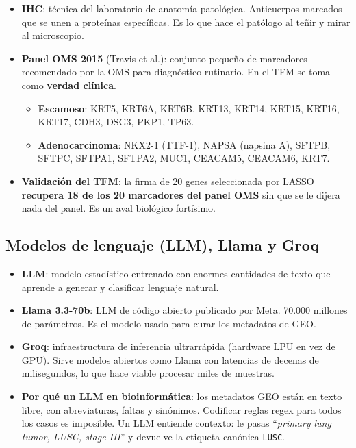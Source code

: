 \documentclass[11pt, a4paper]{article}
\begin{document}
\begin{itemize}[leftmargin=1.2em, itemsep=2pt]
  \item \textbf{IHC}: t\'ecnica del laboratorio de anatom\'ia patol\'ogica. Anticuerpos marcados que se unen a prote\'inas espec\'ificas. Es lo que hace el pat\'ologo al te\~nir y mirar al microscopio.
  \item \textbf{Panel OMS 2015} (Travis et al.): conjunto peque\~no de marcadores recomendado por la OMS para diagn\'ostico rutinario. En el TFM se toma como \textbf{verdad cl\'inica}.
  \begin{itemize}
    \item \textbf{Escamoso}: KRT5, KRT6A, KRT6B, KRT13, KRT14, KRT15, KRT16, KRT17, CDH3, DSG3, PKP1, TP63.
    \item \textbf{Adenocarcinoma}: NKX2-1 (TTF-1), NAPSA (napsina A), SFTPB, SFTPC, SFTPA1, SFTPA2, MUC1, CEACAM5, CEACAM6, KRT7.
  \end{itemize}
  \item \textbf{Validaci\'on del TFM}: la firma de 20 genes seleccionada por LASSO \textbf{recupera 18 de los 20 marcadores del panel OMS} sin que se le dijera nada del panel. Es un aval biol\'ogico fort\'isimo.
\end{itemize}

\subsection{Modelos de lenguaje (LLM), Llama y Groq}

\begin{itemize}[leftmargin=1.2em, itemsep=2pt]
  \item \textbf{LLM}: modelo estad\'istico entrenado con enormes cantidades de texto que aprende a generar y clasificar lenguaje natural.
  \item \textbf{Llama 3.3-70b}: LLM de c\'odigo abierto publicado por Meta. 70.000 millones de par\'ametros. Es el modelo usado para curar los metadatos de GEO.
  \item \textbf{Groq}: infraestructura de inferencia ultrarr\'apida (hardware LPU en vez de GPU). Sirve modelos abiertos como Llama con latencias de decenas de milisegundos, lo que hace viable procesar miles de muestras.
  \item \textbf{Por qu\'e un LLM en bioinform\'atica}: los metadatos GEO est\'an en texto libre, con abreviaturas, faltas y sin\'onimos. Codificar reglas regex para todos los casos es imposible. Un LLM entiende contexto: le pasas ``\emph{primary lung tumor, LUSC, stage III}'' y devuelve la etiqueta can\'onica \texttt{LUSC}.
\end{itemize}
\end{document}
